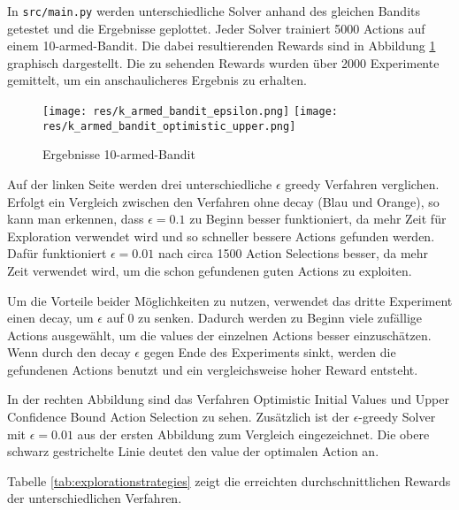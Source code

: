\documentclass[11pt]{scrartcl}
\begin{document}
In \lstinline!src/main.py! werden unterschiedliche Solver anhand des gleichen Bandits
getestet und die Ergebnisse geplottet. Jeder Solver trainiert 5000 Actions auf einem
10-armed-Bandit. Die dabei resultierenden Rewards sind in Abbildung
\ref{fig:karmed_bandit} graphisch dargestellt. Die zu sehenden Rewards wurden über 2000
Experimente gemittelt, um ein anschaulicheres Ergebnis zu erhalten.

\begin{figure}[htp]
\centering
\texttt{[image: res/k\_armed\_bandit\_epsilon.png]}
\texttt{[image: res/k\_armed\_bandit\_optimistic\_upper.png]}
\caption{Ergebnisse 10-armed-Bandit}
\label{fig:karmed_bandit}
\end{figure}

\newpage
Auf der linken Seite werden drei unterschiedliche $\epsilon$ greedy Verfahren verglichen.
Erfolgt ein Vergleich zwischen den Verfahren ohne decay (Blau und Orange), so kann man
erkennen, dass $\epsilon = 0.1$ zu Beginn besser funktioniert, da mehr Zeit für
Exploration verwendet wird und so schneller bessere Actions gefunden werden. Dafür
funktioniert $\epsilon = 0.01$ nach circa 1500 Action Selections besser, da mehr Zeit
verwendet wird, um die schon gefundenen guten Actions zu exploiten.

Um die Vorteile beider Möglichkeiten zu nutzen, verwendet das dritte Experiment einen
decay, um $\epsilon$ auf $0$ zu senken. Dadurch werden zu Beginn viele zufällige Actions
ausgewählt, um die values der einzelnen Actions besser einzuschätzen. Wenn durch den decay
$\epsilon$ gegen Ende des Experiments sinkt, werden die gefundenen Actions benutzt und ein
vergleichsweise hoher Reward entsteht.

In der rechten Abbildung sind das Verfahren Optimistic Initial Values und Upper Confidence
Bound Action Selection zu sehen. Zusätzlich ist der $\epsilon$-greedy Solver mit
$\epsilon=0.01$ aus der ersten Abbildung zum Vergleich eingezeichnet. Die obere schwarz
gestrichelte Linie deutet den value der optimalen Action an.

Tabelle \ref{tab:explorationstrategies} zeigt die erreichten durchschnittlichen Rewards
der unterschiedlichen Verfahren.
\end{document}
